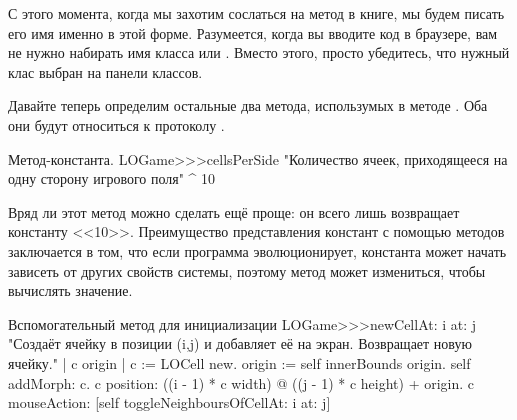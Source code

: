 \documentclass[a4paper,10pt,twoside]{book}
\begin{document}
С этого момента, когда мы захотим сослаться на метод в книге, мы будем писать его имя именно в этой форме. Разумеется, когда вы вводите код в браузере, вам не нужно набирать имя класса или \ct{>>>}. Вместо этого, просто убедитесь, что нужный клас выбран на панели классов.

Давайте теперь определим остальные два метода, использумых в методе . Оба они будут относиться к протоколу .

\begin{method}[sbegamecellsperside]{Метод-константа.}
LOGame>>>cellsPerSide
   "Количество ячеек, приходящееся на одну сторону игрового поля"
   ^ 10
\end{method}

Вряд ли этот метод можно сделать ещё проще: он всего лишь возвращает константу <<10>>. Преимущество представления констант с помощью методов заключается в том, что если программа эволюционирует, константа может начать зависеть от других свойств системы, поэтому метод может измениться, чтобы вычислять значение.

\begin{method}[newCellAt:at:]{Вспомогательный метод для инициализации}
LOGame>>>newCellAt: i at: j
   "Создаёт ячейку в позиции (i,j) и добавляет её на экран. Возвращает новую ячейку."
   | c origin |
   c := LOCell new.
   origin := self innerBounds origin.
   self addMorph: c.
   c position: ((i - 1) * c width) @ ((j - 1) * c height) + origin.
   c mouseAction: [self toggleNeighboursOfCellAt: i at: j]
\end{method}
\end{document}
